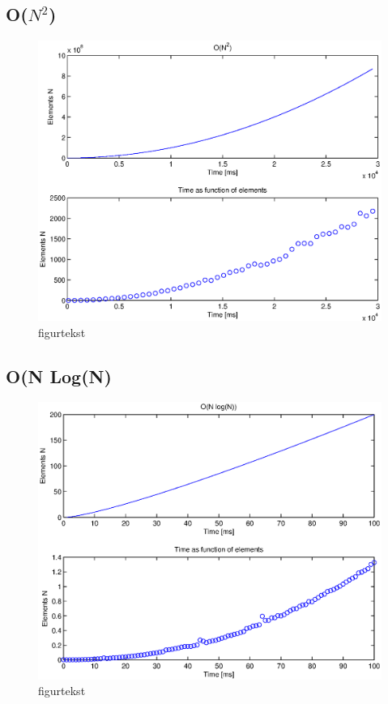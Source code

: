 \subsection{O(\(N^{2}\))}
\begin{figure}[th!]
\centering
\includegraphics[width=1\textwidth]{./graphics/test1.eps}
\caption[tekst i indholdsfortegnelsen]{figurtekst}
\label{fig:}
\end{figure}

\subsection{O(N Log(N)}
\begin{figure}[th!]
\centering
\includegraphics[width=1\textwidth]{./graphics/test2.eps}
\caption[tekst i indholdsfortegnelsen]{figurtekst}
\label{fig:}
\end{figure}